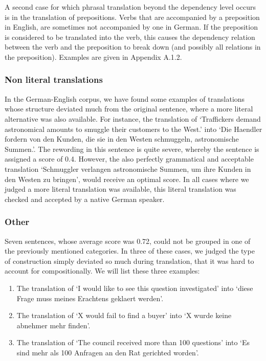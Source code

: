 A second case for which phrasal translation beyond the dependency level occurs is in the translation of prepositions. Verbs that are accompanied by a preposition in English, are sometimes not accompanied by one in German. If the preposition is considered to be translated into the verb, this causes the dependency relation between the verb and the preposition to break down (and possibly all relations in the preposition). Examples are given in Appendix A.1.2.

\subsubsection{Non literal translations}

In the German-English corpus, we have found some examples of translations whose structure deviated much from the original sentence, where a more literal alternative was also available. For instance, the translation of `Traffickers demand astronomical amounts to smuggle their customers to the West.' into `Die Haendler fordern von den Kunden, die sie in den Westen schmuggeln, astronomische Summen.'. The rewording in this sentence is quite severe, whereby the sentence is assigned a score of 0.4. However, the also perfectly grammatical and acceptable translation `Schmuggler verlangen astronomische Summen, um ihre Kunden in den Westen zu bringen', would receive an optimal score. In all cases where we judged a more literal translation was available, this literal translation was checked and accepted by a native German speaker.


\subsubsection{Other}

Seven sentences, whose average score was 0.72, could not be grouped in one of the previously mentioned categories. In three of these cases, we judged the type of construction simply deviated so much during translation, that it was hard to account for compositionally. We will list these three examples:\begin{enumerate}
\item The translation of `I would like to see this question investigated' into `diese Frage muss meines Erachtens geklaert werden'.
\item The translation of `X would fail to find a buyer' into `X wurde keine abnehmer mehr finden'.
\item The translation of `The council received more than 100 questions' into `Es sind mehr als 100 Anfragen an den Rat gerichted worden'.
\end{enumerate} 


